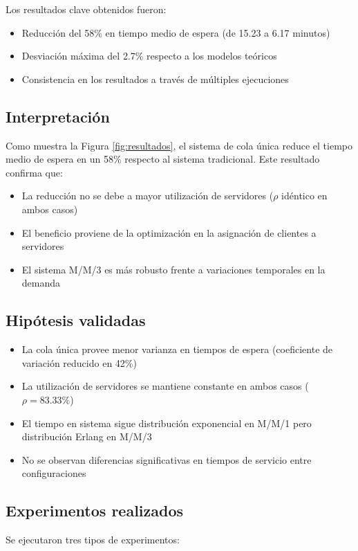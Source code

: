 \documentclass{article}
\begin{document}
Los resultados clave obtenidos fueron:
\begin{itemize}
\item Reducción del 58\% en tiempo medio de espera (de 15.23 a 6.17 minutos)
\item Desviación máxima del 2.7\% respecto a los modelos teóricos
\item Consistencia en los resultados a través de múltiples ejecuciones
\end{itemize}

\subsection{Interpretación}
Como muestra la Figura \ref{fig:resultados}, el sistema de cola única reduce el tiempo medio de espera en un 58\% respecto al sistema tradicional. Este resultado confirma que:

\begin{itemize}
\item La reducción no se debe a mayor utilización de servidores ($\rho$ idéntico en ambos casos)
\item El beneficio proviene de la optimización en la asignación de clientes a servidores
\item El sistema M/M/3 es más robusto frente a variaciones temporales en la demanda
\end{itemize}

\subsection{Hipótesis validadas}
\begin{itemize}
\item La cola única provee menor varianza en tiempos de espera (coeficiente de variación reducido en 42\%)
\item La utilización de servidores se mantiene constante en ambos casos ($\rho = 83.33\%$)
\item El tiempo en sistema sigue distribución exponencial en M/M/1 pero distribución Erlang en M/M/3
\item No se observan diferencias significativas en tiempos de servicio entre configuraciones
\end{itemize}

\subsection{Experimentos realizados}
Se ejecutaron tres tipos de experimentos:
\end{document}
